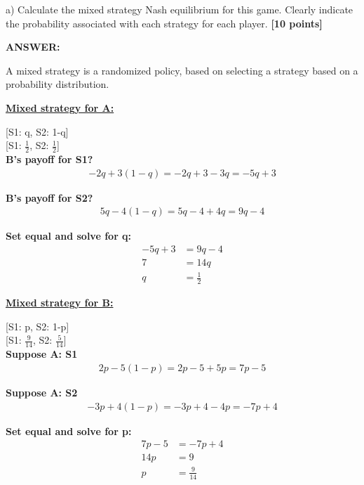 \documentclass{article}
\begin{document}
\vspace{5mm}

\noindent a) Calculate the mixed strategy Nash equilibrium for this game. Clearly indicate the 
probability associated with each strategy for each player. \textbf{[10 points] }

\vspace{3mm}

\noindent \textbf{ANSWER:}

%
%

A mixed strategy is a randomized policy, based on selecting a strategy based on a probability distribution.

\textbf{\underline{Mixed strategy for A:}}

[S1: q, S2: 1-q]\\

[S1: $\frac{1}{2}$, S2: $\frac{1}{2}$]\\


\textbf{B's payoff for S1?}
\begin{align}
-2q + 3(1-q) = -2q + 3 - 3q = -5q + 3
\end{align}



\textbf{B's payoff for S2?}
\begin{align}
5q - 4(1-q) = 5q - 4 + 4q = 9q - 4
\end{align}


\textbf{Set equal and solve for q:}
\begin{align}
-5q + 3 &= 9q - 4\\
7 &= 14q\\
q &= \frac{1}{2}
\end{align}



\textbf{\underline{Mixed strategy for B:}}

[S1: p, S2: 1-p]\\

[S1: $\frac{9}{14}$, S2: $\frac{5}{14}$]\\

\textbf{Suppose A: S1}
\begin{align}
2p - 5(1-p) = 2p - 5 + 5p = 7p - 5
\end{align}


\textbf{Suppose A: S2}
\begin{align}
-3p + 4(1-p) = -3p + 4 - 4p = -7p + 4
\end{align}

\textbf{Set equal and solve for p:}
\begin{align}
7p - 5 &= -7p + 4\\
14p &= 9\\
p &= \frac{9}{14}
\end{align}
\end{document}

